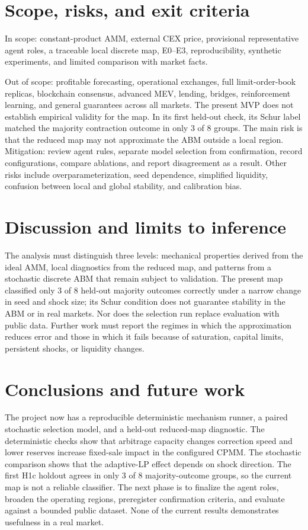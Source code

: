 \section{Scope, risks, and exit criteria}

In scope: constant-product AMM, external CEX price, provisional representative agent
roles, a traceable local discrete map, E0--E3, reproducibility, synthetic experiments,
and limited comparison with market facts.

Out of scope: profitable forecasting, operational exchanges, full limit-order-book
replicas, blockchain consensus, advanced MEV, lending, bridges, reinforcement
learning, and general guarantees across all markets. The present MVP does not establish
empirical validity for the map. In its first held-out check, its Schur label matched the
majority contraction outcome in only 3 of 8 groups. The main risk is that the reduced
map may not approximate the ABM outside a local region. Mitigation: review agent rules,
separate model selection from confirmation, record configurations, compare ablations,
and report disagreement as a result. Other risks include overparameterization, seed
dependence, simplified liquidity, confusion between local and global stability, and
calibration bias.

\section{Discussion and limits to inference}

The analysis must distinguish three levels: mechanical properties derived from the
ideal AMM, local diagnostics from the reduced map, and patterns from a stochastic
discrete ABM that remain subject to validation. The present map classified only 3 of 8
held-out majority outcomes correctly under a narrow change in seed and shock size; its
Schur condition does not guarantee stability in the ABM or in real markets. Nor does
the selection run replace evaluation with public data. Further work must report the
regimes in which the approximation reduces error and those in which it fails because
of saturation, capital limits, persistent shocks, or liquidity changes.

\section{Conclusions and future work}

The project now has a reproducible deterministic mechanism runner, a paired
stochastic selection model, and a held-out reduced-map diagnostic. The deterministic
checks show that arbitrage capacity changes correction speed and lower reserves
increase fixed-sale impact in the configured CPMM. The stochastic comparison shows
that the adaptive-LP effect depends on shock direction. The first H1c holdout agrees in
only 3 of 8 majority-outcome groups, so the current map is not a reliable classifier.
The next phase is to finalize the agent roles, broaden the operating regions, preregister
confirmation criteria, and evaluate against a bounded public dataset. None of the
current results demonstrates usefulness in a real market.
